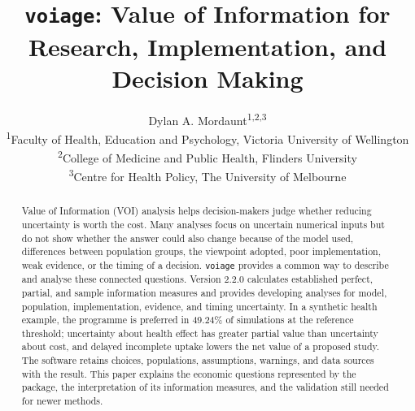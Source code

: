 \documentclass[11pt]{article}
\title{\texttt{voiage}: Value of Information for Research, Implementation,
and Decision Making}
\author{Dylan A. Mordaunt\textsuperscript{1,2,3}\\
  \footnotesize\textsuperscript{1}Faculty of Health, Education and Psychology, Victoria University of Wellington\\
  \footnotesize\textsuperscript{2}College of Medicine and Public Health, Flinders University\\
  \footnotesize\textsuperscript{3}Centre for Health Policy, The University of Melbourne}
\date{}
\begin{document}
\maketitle

\begin{abstract}
Value of Information (VOI) analysis helps decision-makers judge whether
reducing uncertainty is worth the cost. Many analyses focus on uncertain
numerical inputs but do not show whether the answer could also change because
of the model used, differences between population groups, the viewpoint
adopted, poor implementation, weak evidence, or the timing of a decision.
\texttt{voiage} provides a common way to describe and analyse these connected
questions. Version 2.2.0 calculates established perfect, partial, and sample
information measures and provides developing analyses for model, population,
implementation, evidence, and timing uncertainty. In a synthetic health
example, the programme is preferred in 49.24\% of simulations at the reference
threshold; uncertainty about health effect has greater partial value than
uncertainty about cost, and delayed incomplete uptake lowers the net value of
a proposed study. The software retains choices, populations, assumptions,
warnings, and data sources with the result. This paper explains the economic
questions represented by the package, the interpretation of its information
measures, and the validation still needed for newer methods.
\end{abstract}













\begingroup
\small

\endgroup
\end{document}
